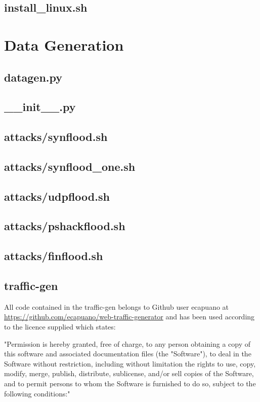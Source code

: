 \subsection{install\_linux.sh}

\section{Data Generation}
\subsection{datagen.py}

\subsection{\_\_init\_\_.py}

\subsection{attacks/synflood.sh}

\subsection{attacks/synflood\_one.sh}

\subsection{attacks/udpflood.sh}

\subsection{attacks/pshackflood.sh}

\subsection{attacks/finflood.sh}

\subsection{traffic-gen}
All code contained in the traffic-gen belongs to Github user ecapuano at \url{https://github.com/ecapuano/web-traffic-generator} and has been used according to the licence supplied which states:

"Permission is hereby granted, free of charge, to any person obtaining a copy
of this software and associated documentation files (the "Software"), to deal
in the Software without restriction, including without limitation the rights
to use, copy, modify, merge, publish, distribute, sublicense, and/or sell
copies of the Software, and to permit persons to whom the Software is
furnished to do so, subject to the following conditions:"

